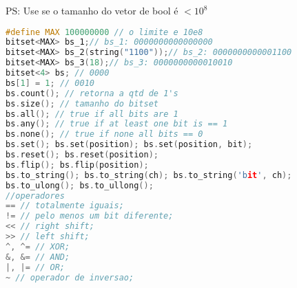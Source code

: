 PS: Use se o tamanho do vetor de bool é $< 10^8$
\begin{lstlisting}[language=C++]
#define MAX 100000000 // o limite e 10e8
bitset<MAX> bs_1;// bs_1: 0000000000000000
bitset<MAX> bs_2(string("1100"));// bs_2: 0000000000001100
bitset<MAX> bs_3(18);// bs_3: 0000000000010010
bitset<4> bs; // 0000
bs[1] = 1; // 0010
bs.count(); // retorna a qtd de 1's
bs.size(); // tamanho do bitset
bs.all(); // true if all bits are 1
bs.any(); // true if at least one bit is == 1
bs.none(); // true if none all bits == 0
bs.set(); bs.set(position); bs.set(position, bit);
bs.reset(); bs.reset(position);
bs.flip(); bs.flip(position);
bs.to_string(); bs.to_string(ch); bs.to_string('bit', ch);
bs.to_ulong(); bs.to_ullong();
//operadores
== // totalmente iguais;
!= // pelo menos um bit diferente;
<< // right shift; 
>> // left shift;
^, ^= // XOR; 
&, &= // AND; 
|, |= // OR;
~ // operador de inversao;
\end{lstlisting}

